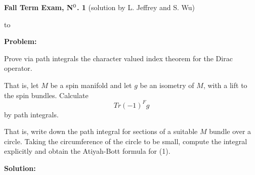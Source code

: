 \documentclass[12pt]{article}
\begin{document}
\vfill\eject






\noindent
{\bf Fall Term Exam, N$^{\rm{0}}$. 1}\qquad\qquad\qquad
\qquad\qquad\qquad(solution by L. Jeffrey and S. Wu)

\smallskip
\hbox to \hsize{\hrulefill}

\bigskip
\noindent
{\bf Problem:}
\medskip



\noindent Prove via path integrals the character valued index theorem for
the Dirac operator. 
\medskip

\noindent That is, let $M$ be a spin manifold and 
let $g$ be an isometry of $M$, with a lift to the spin bundles. 
Calculate 
$$
Tr  (-1)^F g
$$
by path integrals. 

\medskip
\noindent That is, write down the path integral for sections of a suitable $M$ 
bundle over a circle. Taking the circumference of the circle to be small,
compute the integral explicitly and obtain the Atiyah-Bott formula 
for (1).

\newcommand{\RR}{{\mathbf{R}}}
\newcommand{\CC}{{\mathbf{C}}}
\newcommand{\ZZ}{{\mathbf{Z}}}
\newcommand{\calh}{ { \cal H} } 
\newcommand{\cals}{ { \cal S} } 
\newcommand{\cald}{ { \cal D} } 
\newcommand{\norm}{{\cal N}}


\bigskip
\noindent
{\bf Solution:}
\medskip 
\end{document}
